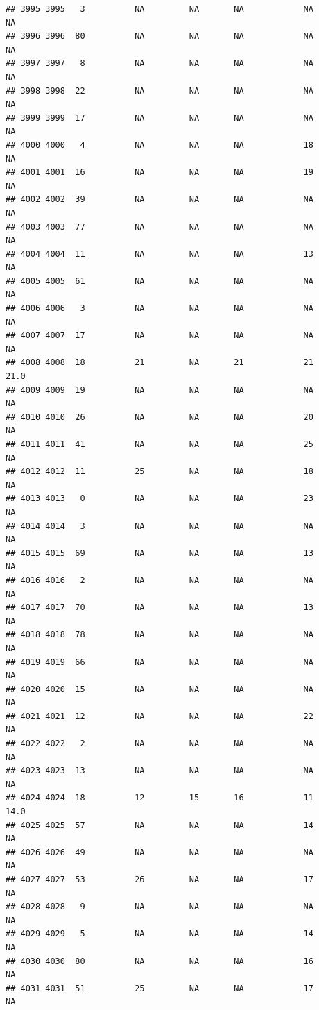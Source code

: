 \documentclass[man]{apa6}
\begin{document}
\begin{verbatim}
## 3995 3995   3          NA         NA       NA            NA       NA
## 3996 3996  80          NA         NA       NA            NA       NA
## 3997 3997   8          NA         NA       NA            NA       NA
## 3998 3998  22          NA         NA       NA            NA       NA
## 3999 3999  17          NA         NA       NA            NA       NA
## 4000 4000   4          NA         NA       NA            18       NA
## 4001 4001  16          NA         NA       NA            19       NA
## 4002 4002  39          NA         NA       NA            NA       NA
## 4003 4003  77          NA         NA       NA            NA       NA
## 4004 4004  11          NA         NA       NA            13       NA
## 4005 4005  61          NA         NA       NA            NA       NA
## 4006 4006   3          NA         NA       NA            NA       NA
## 4007 4007  17          NA         NA       NA            NA       NA
## 4008 4008  18          21         NA       21            21     21.0
## 4009 4009  19          NA         NA       NA            NA       NA
## 4010 4010  26          NA         NA       NA            20       NA
## 4011 4011  41          NA         NA       NA            25       NA
## 4012 4012  11          25         NA       NA            18       NA
## 4013 4013   0          NA         NA       NA            23       NA
## 4014 4014   3          NA         NA       NA            NA       NA
## 4015 4015  69          NA         NA       NA            13       NA
## 4016 4016   2          NA         NA       NA            NA       NA
## 4017 4017  70          NA         NA       NA            13       NA
## 4018 4018  78          NA         NA       NA            NA       NA
## 4019 4019  66          NA         NA       NA            NA       NA
## 4020 4020  15          NA         NA       NA            NA       NA
## 4021 4021  12          NA         NA       NA            22       NA
## 4022 4022   2          NA         NA       NA            NA       NA
## 4023 4023  13          NA         NA       NA            NA       NA
## 4024 4024  18          12         15       16            11     14.0
## 4025 4025  57          NA         NA       NA            14       NA
## 4026 4026  49          NA         NA       NA            NA       NA
## 4027 4027  53          26         NA       NA            17       NA
## 4028 4028   9          NA         NA       NA            NA       NA
## 4029 4029   5          NA         NA       NA            14       NA
## 4030 4030  80          NA         NA       NA            16       NA
## 4031 4031  51          25         NA       NA            17       NA

\end{verbatim}
\end{document}
